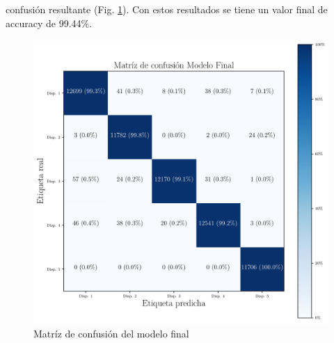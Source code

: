 confusión resultante (Fig. \ref{fig:final_matrix}). Con estos resultados se tiene un valor final de accuracy de 99.44\%.

\begin{figure}[H]
    \centering
    \includegraphics[scale=0.3]{../Python/plots/parallel/final_model_matrix}
    \caption{Matríz de confusión del modelo final}
    \label{fig:final_matrix}
\end{figure}
